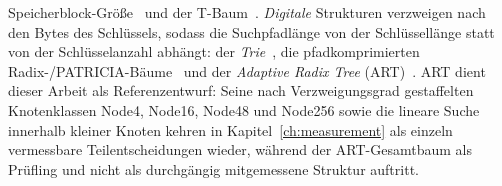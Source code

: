\begin{nurkurz}
Speicherblock-Größe~\cite{graefe2001btree,hankins2003nodesize} und der T-Baum~\cite{lehman1986ttree}\@. \emph{Digitale}
Strukturen verzweigen nach den Bytes des Schlüssels, sodass die Suchpfadlänge von der Schlüssellänge statt von der
Schlüsselanzahl abhängt: der \emph{Trie}~\cite{delabriandais1959trie,fredkin1960trie}, die pfadkomprimierten
Radix-/PATRICIA-Bäume~\cite{morrison1968patricia} und der \emph{Adaptive Radix Tree} (ART)~\cite{leis2013art}. ART
dient dieser Arbeit als Referenzentwurf: Seine nach Verzweigungsgrad gestaffelten Knotenklassen Node4, Node16,
Node48 und Node256 sowie die lineare Suche innerhalb kleiner Knoten kehren in Kapitel~\ref{ch:measurement} als
einzeln vermessbare Teilentscheidungen wieder, während der ART-Gesamtbaum als Prüfling und nicht als durchgängig
mitgemessene Struktur auftritt.
\end{nurkurz}

